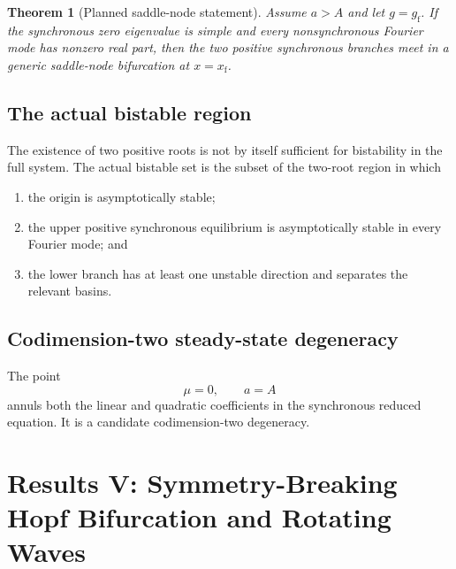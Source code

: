 \documentclass[11pt, reqno]{amsart}
\newtheorem{theorem}{Theorem}[section]
\theoremstyle{definition}
\theoremstyle{remark}
\begin{document}
\begin{theorem}[Planned saddle-node statement]
Assume $a>A$ and let $g=g_{\mathrm f}$.  If the synchronous zero eigenvalue is
simple and every nonsynchronous Fourier mode has nonzero real part, then the two
positive synchronous branches meet in a generic saddle-node bifurcation at
$x=x_{\mathrm f}$.
\end{theorem}


\subsection{The actual bistable region}

The existence of two positive roots is not by itself sufficient for bistability
in the full system.  The actual bistable set is the subset of the two-root
region in which
\begin{enumerate}[label=(\roman*),leftmargin=2.5em]
    \item the origin is asymptotically stable;
    \item the upper positive synchronous equilibrium is asymptotically stable
    in every Fourier mode; and
    \item the lower branch has at least one unstable direction and separates
    the relevant basins.
\end{enumerate}


\subsection{Codimension-two steady-state degeneracy}

The point
\[
    \mu=0,
    \qquad
    a=A
\]
annuls both the linear and quadratic coefficients in the synchronous reduced
equation.  It is a candidate codimension-two degeneracy.


\section{Results V: Symmetry-Breaking Hopf Bifurcation and Rotating Waves}
\label{sec:hopf}
\end{document}
